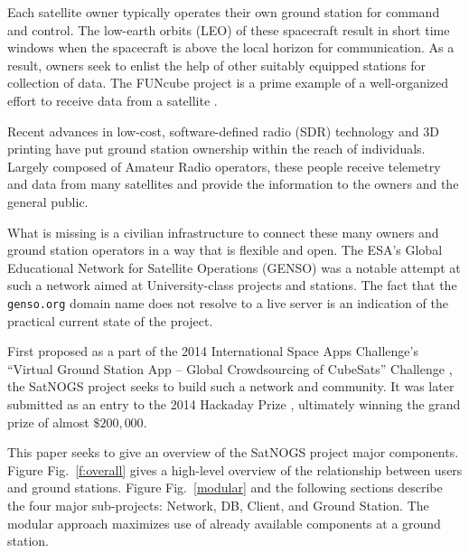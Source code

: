 \documentclass[conference]{IEEEtran}
\newcommand{\figref}[1]{Fig.~\ref{#1}}
\begin{document}
Each satellite owner typically operates their own ground station for command and control.
The low-earth orbits (LEO) of these spacecraft result in short time windows when the spacecraft is above the local horizon for communication.
As a result, owners seek to enlist the help of other suitably equipped stations for collection of data.
The FUNcube project is a prime example of a well-organized effort to receive data from a satellite \cite{FUNcube}.

Recent advances in low-cost, software-defined radio (SDR) technology and 3D printing have put ground station ownership within the reach of individuals.
Largely composed of Amateur Radio operators, these people receive telemetry and data from many satellites and provide the information to the owners and the general public.


What is missing is a civilian infrastructure to connect these many owners and ground station operators in a way that is flexible and open.
The ESA's Global Educational Network for Satellite Operations (GENSO) \cite{GENSO} was a notable attempt at such a network aimed at University-class projects and stations.
The fact that the \verb|genso.org| domain name does not resolve to a live server is an indication of the practical current state of the project.

First proposed as a part of the 2014 International Space Apps Challenge's ``Virtual Ground Station App -- Global Crowdsourcing of CubeSats'' Challenge \cite{SpaceAppsChallenge2014-SatNOGS}, the SatNOGS project seeks to build such a network and community.
It was later submitted as an entry to the 2014 Hackaday Prize \cite{Hackaday-SatNOGS}, ultimately winning the grand prize of almost $\$200,000$.

This paper seeks to give an overview of the SatNOGS project major components.
Figure \figref{f:overall} gives a high-level overview of the relationship between users and ground stations.
Figure \figref{modular} and the following sections describe the four major sub-projects: Network, DB, Client, and Ground Station.
The modular approach maximizes use of already available components at a ground station.
\end{document}
